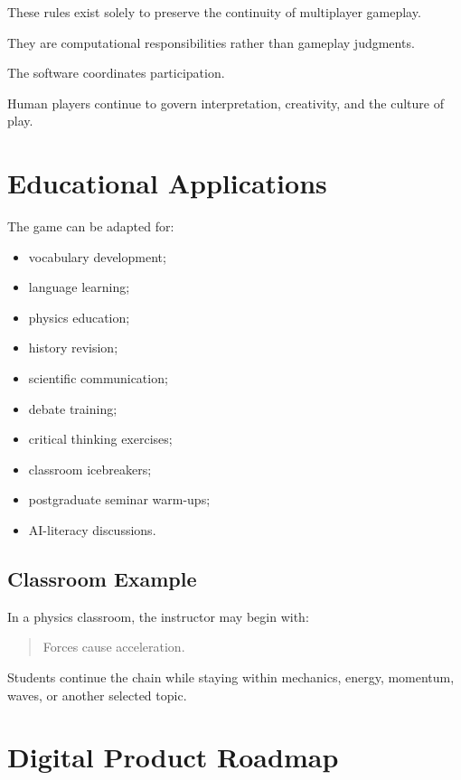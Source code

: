 \documentclass[11pt,a4paper]{article}
\begin{document}
These rules exist solely to preserve the continuity of multiplayer gameplay.

They are computational responsibilities rather than gameplay judgments.

The software coordinates participation.

Human players continue to govern interpretation, creativity, and the culture of play.


\section{Educational Applications}

The game can be adapted for:

\begin{itemize}
    \item vocabulary development;
    \item language learning;
    \item physics education;
    \item history revision;
    \item scientific communication;
    \item debate training;
    \item critical thinking exercises;
    \item classroom icebreakers;
    \item postgraduate seminar warm-ups;
    \item AI-literacy discussions.
\end{itemize}

\subsection{Classroom Example}

In a physics classroom, the instructor may begin with:

\begin{quote}
Forces cause acceleration.
\end{quote}

Students continue the chain while staying within mechanics, energy, momentum, waves, or another selected topic.

\section{Digital Product Roadmap}
\end{document}
